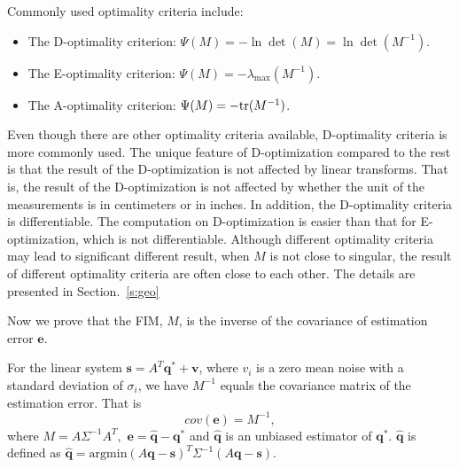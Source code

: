 Commonly used optimality criteria include:
\begin{itemize}
  \item The D-optimality criterion: $\Psi(M)=-\ln\det(M)=\ln\det(M^{-1})$. %
  \item The E-optimality criterion: $\Psi(M)=-\lambda_{\max}(M^{-1})$.
  \item The A-optimality criterion: $\Psi(M)=-\hbox{tr}(M^{-1})$.
\end{itemize}
Even though there are other optimality criteria available, D-optimality criteria is more commonly used. The unique feature of D-optimization compared to the rest is
that the result of the D-optimization is not affected by linear transforms. That is, the result of the D-optimization is not affected by whether the unit of the measurements is in centimeters or in inches. In addition, the D-optimality criteria is differentiable. The computation on D-optimization is easier than that for E-optimization, which is not differentiable.
    Although different optimality criteria may lead to significant different result, when $M$ is not close to singular, the result of different optimality criteria are often close to each other. The details are presented in Section.~\ref{s:geo}




Now we prove that the FIM, $M$, is the inverse of the covariance of estimation error $\mathbf{e}$.

\begin{thm}\label{t:invM}%
   For the linear system $\mathbf{s}=A^T \mathbf{q}^\ast + \mathbf{v}$, where $v_i$ is a zero mean noise with a standard deviation of $\sigma_i$, we have $M^{-1}$ equals the covariance matrix of the estimation error. That is
   $$cov(\mathbf{e}) = M^{-1},$$ where $M=A\Sigma^{-1}A^T,$ $\mathbf{e}=\mathbf{\hat{q}}-\mathbf{q}^\ast$ and $\mathbf{\hat{q}}$ is an unbiased estimator of $\mathbf{q}^\ast$. $\mathbf{\hat{q}}$ is defined as
   $\mathbf{\hat{q}}= \mathrm{argmin} (A\mathbf{q}-\mathbf{s})^T\Sigma^{-1}(A\mathbf{q}-\mathbf{s}).$
\end{thm}

